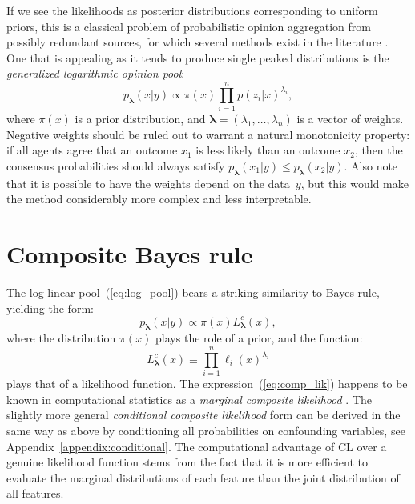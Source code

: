 \documentclass[english]{scrartcl}
\newcommand{\lda}{{\boldsymbol{\lambda}}}
\begin{document}
If we see the likelihoods as posterior distributions corresponding to uniform priors, this is a classical problem of probabilistic opinion aggregation from possibly redundant sources, for which several methods exist in the literature \cite{Tarantola-82,Genest-86,Garg-04,Allard-12}. One that is appealing as it tends to produce single peaked distributions is the {\em generalized logarithmic opinion pool}:
\begin{equation}
\label{eq:log_pool}
p_\lda(x|y) \propto \pi(x) \prod_{i=1}^n p(z_i|x)^{\lambda_i},
\end{equation} 
where $\pi(x)$ is a prior distribution, and $\lda=(\lambda_1,\ldots,\lambda_n)$ is a vector of weights. Negative weights should be ruled out to warrant a natural monotonicity property: if all agents agree that an outcome $x_1$ is less likely than an outcome $x_2$, then the consensus probabilities should always satisfy $p_\lda(x_1|y)\leq p_\lda(x_2|y)$. Also note that it is possible to have the weights depend on the data~$y$, but this would make the method considerably more complex and less interpretable. 







\section{Composite Bayes rule}
\label{sec:bayes_rule}

The log-linear pool~(\ref{eq:log_pool}) bears a striking similarity to Bayes rule, yielding  the form: 
$$
p_\lda(x|y)\propto \pi(x) L^c_\lda(x),
$$
where the distribution $\pi(x)$ plays the role of a prior, and the function:
\begin{equation}
\label{eq:comp_lik}
L^c_\lda(x) \equiv \prod_{i=1}^n \ell_i (x)^{\lambda_i}
\end{equation} 
plays that of a likelihood function. The expression~(\ref{eq:comp_lik}) happens to be known in computational statistics as a {\em marginal composite likelihood} \cite{Varin-11}. The slightly more general {\em conditional composite likelihood} form can be derived in the same way as above by conditioning all probabilities on confounding variables, see Appendix~\ref{appendix:conditional}. The computational advantage of CL over a genuine likelihood function stems from the fact that it is more efficient to evaluate the marginal distributions of each feature than the joint distribution of all features.
\end{document}
